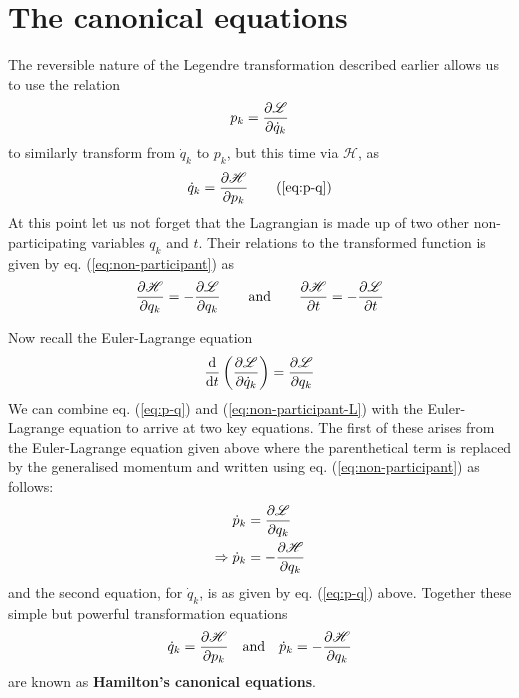 \documentclass[english,seminar,headertitle]{lecture}
\newcommand{\lag}{\mathscr{L}}
\newcommand{\ham}{\mathscr{H}}
\begin{document}
\section{The canonical equations}

The reversible nature of the Legendre transformation described earlier allows us to use the relation
\begin{equation}
	p_k = {\partial \lag \over \partial \dot{q}_k } \label{eq:p-q}
\end{equation}%
to similarly transform from $\dot{q}_k$ to $p_k$, but this time via $\ham$, as
\begin{align*}
	\dot{q}_k = {\partial \ham \over \partial p_k } \tag{\ref{eq:p-q}}
\end{align*}%
At this point let us not forget that the Lagrangian is made up of two other non-participating variables $q_k$ and $t$. Their relations to the transformed function is given by eq. (\ref{eq:non-participant}) as
\begin{equation}
	{\partial \ham \over \partial q_k } = - {\partial \lag \over \partial q_k } \qquad \textrm{and} \qquad {\partial \ham \over \partial t } = - {\partial \lag \over \partial t } \label{eq:non-participant-L}
\end{equation}

Now recall the Euler-Lagrange equation
$$
{\textrm{d} \over \textrm{d} t } \left( \partial \lag \over \partial \dot{q}_k \right) = {\partial \lag \over \partial q_k }
$$
We can combine eq. (\ref{eq:p-q}) and (\ref{eq:non-participant-L}) with the Euler-Lagrange equation to arrive at two key equations. The first of these arises from the Euler-Lagrange equation given above where the parenthetical term is replaced by the generalised momentum and written using eq. (\ref{eq:non-participant}) as follows:
\begin{align*}
	\dot{p}_k &= {\partial \lag \over \partial q_k } \\
	\Rightarrow \dot{p}_k &= - {\partial \ham \over \partial q_k } %
\end{align*}%
and the second equation, for $\dot{q}_k$, is as given by eq. (\ref{eq:p-q}) above. Together these simple but powerful transformation equations
\begin{equation}
	 \dot{q}_k = {\partial \ham \over \partial p_k } \quad \textrm{and} \quad \dot{p}_k = - {\partial \ham \over \partial q_k } %
\end{equation}%
are known as \textbf{Hamilton's canonical equations}.
\end{document}
